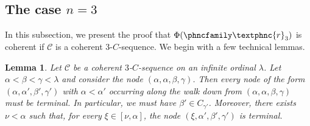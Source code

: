 \documentclass{amsart}
\numberwithin{theorem}{section}
\newtheorem{lemma}[theorem]{Lemma}
\theoremstyle{definition}
\newcommand{\mc}{\mathcal}
\newcommand{\C}{\mathcal{C}}
\newcommand{\resh}{{\phncfamily\textphnc{r}}}
\begin{document}
\subsection{The case $n=3$} In this subsection, we present the proof that $\Phi(\resh_3)$ is 
coherent if $\mc{C}$ is a coherent $3$-$C$-sequence. We begin with a few technical lemmas.

\begin{lemma}\label{alphaAlphaTerminal}
Let $\C$ be a coherent $3$-$C$-sequence on an infinite ordinal $\lambda$. Let $\alpha<\beta<\gamma<\lambda$ and consider the node $(\alpha,\alpha,\beta,\gamma)$. Then every node of the form $(\alpha,\alpha',\beta',\gamma')$ with $\alpha<\alpha'$ occurring along the walk down from $(\alpha,\alpha,\beta,\gamma)$ must be terminal. In particular, we must have $\beta' \in C_{\gamma'}$. Moreover, there exists $\nu<\alpha$ such that, for every $\xi\in [\nu,\alpha]$, the node $(\xi,\alpha',\beta',\gamma')$ is terminal.

\end{lemma}
\end{document}
